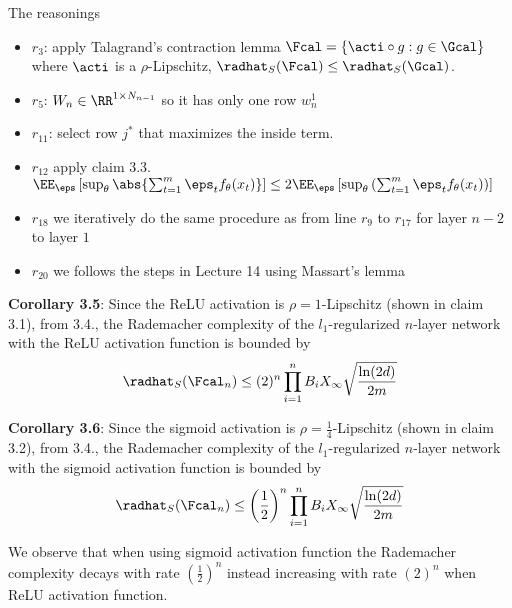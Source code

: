 The reasonings
\begin{itemize}
\item $r_3$: apply Talagrand's contraction lemma $\Fcal = \{ \acti \circ g : g \in \Gcal \}$ where $\acti$ is a $\rho$-Lipschitz, $\radhat_S(\Fcal) \le \radhat_S(\Gcal)$.
\item $r_5$: $W_n \in \RR^{1 \times N_{n-1}}$ so it has only one row $w_n^1$
\item $r_{11}$: select row $j^*$ that maximizes the inside term.  
\item $r_{12}$ apply claim 3.3. $\EE_{\eps} \left[ \sup_{\theta}\abs{\sum_{t=1}^m \eps_tf_{\theta}(x_t)} \right] \le 2\EE_{\eps} \left[ \sup_{\theta} \left( \sum_{t=1}^m \eps_tf_{\theta}(x_t) \right) \right]$
\item $r_{18}$ we iteratively do the same procedure as from line $r_9$ to $r_{17}$ for layer $n-2$ to layer $1$
\item $r_{20}$ we follows the steps in Lecture 14 using Massart's lemma
\end{itemize}

\textbf{Corollary 3.5}: Since the ReLU activation is $\rho=1$-Lipschitz (shown in claim 3.1), from 3.4., the Rademacher complexity of the $l_1$-regularized $n$-layer network with the ReLU activation function is bounded by
\begin{align*}
  \radhat_S(\Fcal_n) \le (2)^{n} \prod_{i=1}^{n}B_{i} X_{\infty}\sqrt{\frac{\ln(2d)}{2m}}
\end{align*}

\textbf{Corollary 3.6}: Since the sigmoid activation is $\rho=\frac{1}{4}$-Lipschitz (shown in claim 3.2), from 3.4., the Rademacher complexity of the $l_1$-regularized $n$-layer network with the sigmoid activation function is bounded by
\begin{align*}
  \radhat_S(\Fcal_n) \le \left(\frac{1}{2}\right)^{n} \prod_{i=1}^{n}B_{i} X_{\infty}\sqrt{\frac{\ln(2d)}{2m}}
\end{align*}

We observe that when using sigmoid activation function the Rademacher complexity decays with rate $\left(\frac{1}{2}\right)^{n}$ instead increasing with rate $(2)^{n}$ when ReLU activation function.